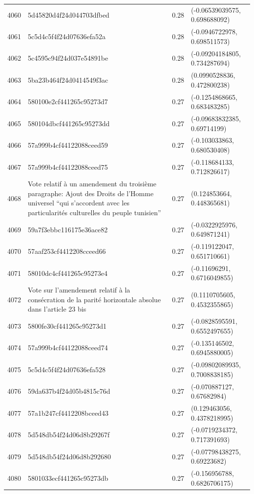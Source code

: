 \begin{table}[ht]
\begin{tabular}{rlrl}
  4060 & 5d45820d4f24d044703dfbed & 0.28 & (-0.06539039575, 0.698688092) \\ 
  4061 & 5c5d4c5f4f24d07636efa52a & 0.28 & (-0.0946722978, 0.698511573) \\ 
  4062 & 5c4595c94f24d037e54891be & 0.28 & (-0.09204184805, 0.734287694) \\ 
  4063 & 5ba23b464f24d0414549f3ac & 0.28 & (0.0990528836, 0.472800238) \\ 
  4064 & 580100e2cf441265c95273d7 & 0.27 & (-0.1254868665, 0.683483285) \\ 
  4065 & 580104dbcf441265c95273dd & 0.27 & (-0.09683832385, 0.69714199) \\ 
  4066 & 57a999b4cf44122088ceed59 & 0.27 & (-0.103033863, 0.680530408) \\ 
  4067 & 57a999b4cf44122088ceed75 & 0.27 & (-0.118684133, 0.712826617) \\ 
  4068 & Vote relatif à un amendement du troisième paragraphe: Ajout des Droits de l’Homme universel “qui s’accordent avec les particularités culturelles du peuple tunisien” & 0.27 & (0.124853664, 0.448365681) \\ 
  4069 & 59a7f3ebbc116175e36ace82 & 0.27 & (-0.0322925976, 0.649871241) \\ 
  4070 & 57aaf253cf4412208cceed66 & 0.27 & (-0.119122047, 0.651710661) \\ 
  4071 & 58010dc4cf441265c95273e4 & 0.27 & (-0.11696291, 0.6716049855) \\ 
  4072 & Vote sur l'amendement relatif à la consécration de la parité horizontale absolue dans l'article 23 bis & 0.27 & (0.1110705605, 0.4532355865) \\ 
  4073 & 5800fe30cf441265c95273d1 & 0.27 & (-0.0828595591, 0.6552497655) \\ 
  4074 & 57a999b4cf44122088ceed74 & 0.27 & (-0.135146502, 0.6945880005) \\ 
  4075 & 5c5d4c5f4f24d07636efa528 & 0.27 & (-0.09802089935, 0.7008838185) \\ 
  4076 & 59da637b4f24d05b4815c76d & 0.27 & (-0.070887127, 0.67682984) \\ 
  4077 & 57a1b247cf4412208bceed43 & 0.27 & (0.129463056, 0.4378218995) \\ 
  4078 & 5d548db54f24d06d8b29267f & 0.27 & (-0.0719234372, 0.717391693) \\ 
  4079 & 5d548db54f24d06d8b292680 & 0.27 & (-0.07798438275, 0.69223682) \\ 
  4080 & 5801033ecf441265c95273db & 0.27 & (-0.156956788, 0.6826706175) \\ 

\end{tabular}
\end{table}
